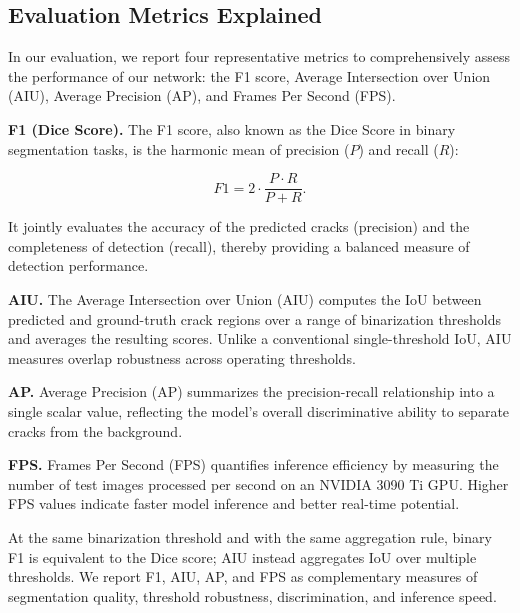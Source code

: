 \documentclass[journal]{IEEEtran}
\begin{document}


\subsection{Evaluation Metrics Explained}


In our evaluation, we report four representative metrics to comprehensively assess the performance of our network: 
the F1 score, Average Intersection over Union (AIU), Average Precision (AP), and Frames Per Second (FPS).



\textbf{F1 (Dice Score).} 
The F1 score, also known as the Dice Score in binary segmentation tasks, is the harmonic mean of precision ($P$) and recall ($R$):


\begin{equation}
F1 = 2 \cdot \frac{P \cdot R}{P + R}.
\end{equation}



It jointly evaluates the accuracy of the predicted cracks (precision) and the completeness of detection (recall), 
thereby providing a balanced measure of detection performance.



\textbf{AIU.}
The Average Intersection over Union (AIU) computes the IoU between predicted and ground-truth crack regions over a range of binarization thresholds and averages the resulting scores. Unlike a conventional single-threshold IoU, AIU measures overlap robustness across operating thresholds.



\textbf{AP.}
Average Precision (AP) summarizes the precision-recall relationship into a single scalar value, 
reflecting the model’s overall discriminative ability to separate cracks from the background.



\textbf{FPS.}
Frames Per Second (FPS) quantifies inference efficiency by measuring the number of test images processed per second on an NVIDIA 3090 Ti GPU. 
Higher FPS values indicate faster model inference and better real-time potential.



At the same binarization threshold and with the same aggregation rule, binary F1 is equivalent to the Dice score; AIU instead aggregates IoU over multiple thresholds. We report F1, AIU, AP, and FPS as complementary measures of segmentation quality, threshold robustness, discrimination, and inference speed.
\end{document}
